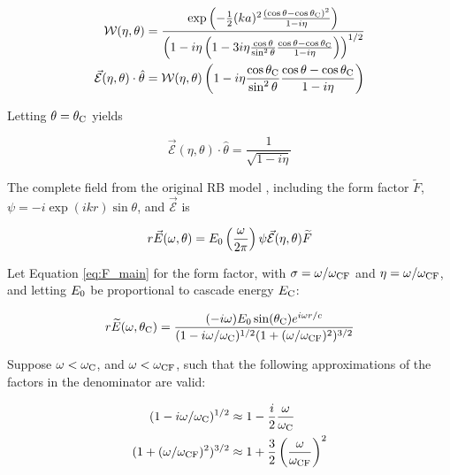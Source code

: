 \documentclass[amsmath,amssymb,aps,prd,10pt,twocolumn]{revtex4}
\begin{document}
\begin{align}
\mathcal{W}(\eta,\theta) &= \frac{\exp\left( -\frac{1}{2}(ka)^2 \frac{(\cos\theta - \cos\theta_{\rm C})^2}{1-i\eta} \right)}{\left(1-i\eta\left(1-3i\eta \frac{\cos\theta}{\sin^2\theta}\frac{\cos\theta - \cos\theta_{\rm C}}{1-i\eta}\right) \right)^{1/2}} \\
\vec{\mathcal{E}}(\eta,\theta) \cdot \hat{\theta} &= \mathcal{W}(\eta,\theta) \left(1-i\eta \frac{\cos\theta_{\rm C}}{\sin^2\theta} \frac{\cos\theta - \cos\theta_{\rm C}}{1-i\eta} \right) \label{app:eq:big_one_1}
\end{align}

Letting $\theta = \theta_{\rm C}$ yields

\begin{equation}
\vec{\mathcal{E}}(\eta,\theta) \cdot \hat{\theta} = \frac{1}{\sqrt{1-i\eta}}
\end{equation}

The complete field from the original RB model \cite{10.1103/physrevd.65.016003}, including the form factor $\widetilde{F}$, $\psi = -i \exp(ikr) \sin\theta$, and $\vec{\mathcal{E}}$ is 

\begin{equation}
r\vec{E}(\omega,\theta) = E_{\rm 0} \left( \frac{\omega}{2\pi} \right) \psi \vec{\mathcal{E}}(\eta,\theta) \widetilde{F} \label{app:eq:main}
\end{equation}

Let Equation \ref{eq:F_main} for the form factor, with $\sigma = \omega/\omega_{\rm CF}$ and $\eta = \omega/\omega_{\rm CF}$, and letting $E_{\rm 0}$ be proportional to cascade energy $E_{\rm C}$:

\begin{equation}
r\widetilde{E}(\omega,\theta_{\rm C}) = \frac{(-i\omega) E_0 \sin(\theta_{\rm C}) e^{i\omega r/c}}{(1-i \omega/\omega_{\rm C})^{1/2} (1+(\omega/\omega_{\rm CF})^2)^{3/2}} \label{app:eq:re_1}
\end{equation}

Suppose $\omega < \omega_{\rm C}$, and $\omega < \omega_{\rm CF}$, such that the following approximations of the factors in the denominator are valid:

\begin{align}
(1-i \omega / \omega_{\rm C})^{1/2} &\approx 1 - \frac{i}{2} \frac{\omega}{\omega_{\rm C}} \\
(1+(\omega/\omega_{\rm CF})^2)^{3/2} & \approx 1 + \frac{3}{2} \left(\frac{\omega}{\omega_{\rm CF}}\right)^2
\end{align}
\end{document}
